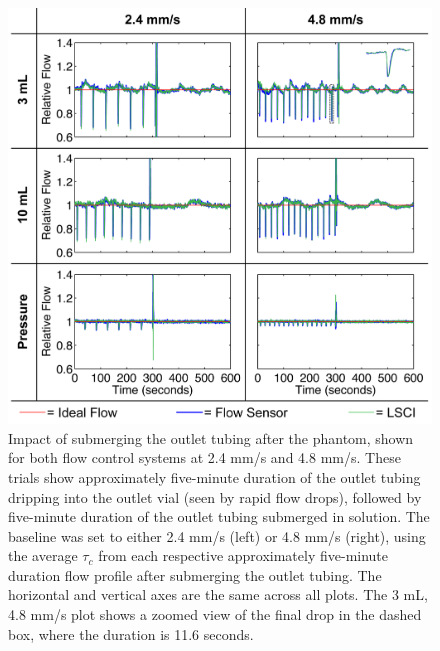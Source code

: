 \documentclass{article}
\begin{document}
\begin{figure}
    \includegraphics[width=\textwidth]{FigureS1.png}
    \caption {
        Impact of submerging the outlet tubing after the phantom, shown for both flow control systems at 2.4 mm/s and 4.8 mm/s. These trials show approximately five-minute duration of the outlet tubing dripping into the outlet vial (seen by rapid flow drops), followed by five-minute duration of the outlet tubing submerged in solution. The baseline was set to either 2.4 mm/s (left) or 4.8 mm/s (right), using the average $\tau_{c}$ from each respective approximately five-minute duration flow profile after submerging the outlet tubing. The horizontal and vertical axes are the same across all plots. The 3 mL, 4.8 mm/s plot shows a zoomed view of the final drop in the dashed box, where the duration is 11.6 seconds.
    }
    \label{fig:supplement_outlet}
\end{figure}
\end{document}
